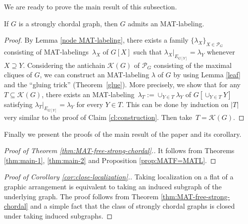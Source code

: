\documentclass[ALCO, Unicode,published]{cedram}
\newcommand{\mcK}{\mathcal{K}}
\begin{document}
We are ready to prove the main result of this subsection.
\begin{theorem}
\label{thm:main-2} 
If $ G $ is a strongly chordal graph, then $G$ admits an MAT-labeling. 
\end{theorem}
\begin{proof}
By Lemma \ref{node MAT-labeling}, there exists a family $ \{\lambda_{X}\}_{X \in \mathcal{P}_{G}} $ consisting of MAT-labelings~$ \lambda_{X} $ of $ G[X] $ such that $ \lambda_{X}|_{E_{G[Y]}} = \lambda_{Y} $ whenever $ X \supseteq Y $. 
Considering the antichain $\mcK(G)$ of $ \mathcal{P}_{G} $ consisting of the maximal cliques of $ G $, we can construct an MAT-labeling $ \lambda $ of $ G $ by using Lemma \ref{leaf} and the ``gluing trick'' (Theorem~\ref{glue}). 
More precisely, we show that for any $T \subseteq \mcK(G)$, there exists an MAT-labeling~$ \lambda_{T}:= \cup_{Y \in T} \lambda_Y$ of $ G[\cup_{Y \in T}Y] $ satisfying $ \lambda_{T}|_{E_{G[Y]}} = \lambda_{Y} $ for every $ Y \in T $. 
This can be done by induction on $ |T| $ very similar to the proof of Claim \ref{cl:construction}. 
Then take~$T = \mcK(G)$.
\end{proof}

Finally we present the proofs of the main result of the paper and its corollary. 

\begin{proof}[Proof of Theorem \ref{thm:MAT-free-strong-chordal}.]
It follows from Theorems \ref{thm:main-1}, \ref{thm:main-2} and Proposition \ref{prop:MATF=MATL}.
\end{proof}

\begin{proof}[Proof of Corollary \ref{cor:close-localization}.]
Taking localization on a flat of a graphic arrangement is equivalent to taking an induced subgraph of the underlying graph. 
The proof follows from Theorem \ref{thm:MAT-free-strong-chordal} and a simple fact that the class of strongly chordal graphs is closed under taking induced subgraphs. 
\end{proof}
\end{document}
